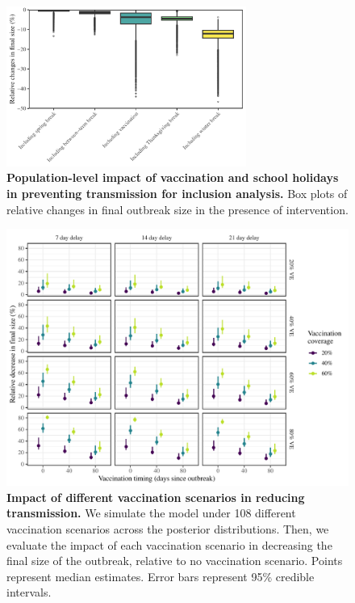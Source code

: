\documentclass[12pt]{article}
\begin{document}
\pagebreak

\begin{figure}[!th]
\begin{center}
\includegraphics[width=0.7\textwidth]{../figure_stanfit_seirv_final/figure_stanfit_effects_inclusion.pdf}
\caption{
\textbf{Population-level impact of vaccination and school holidays in preventing transmission for inclusion analysis.}
Box plots of relative changes in final outbreak size in the presence of intervention.
}
\end{center}
\end{figure}

\pagebreak

\begin{figure}[!h]
\includegraphics[width=\textwidth]{../figure_stanfit_seirv_final/figure_stanfit_strategy.pdf}
\caption{
\textbf{Impact of different vaccination scenarios in reducing transmission.}
We simulate the model under 108 different vaccination scenarios across the posterior distributions.
Then, we evaluate the impact of each vaccination scenario in decreasing the final size of the outbreak, relative to no vaccination scenario.
Points represent median estimates.
Error bars represent 95\% credible intervals.
}
\label{fig}
\end{figure}


\pagebreak


\end{document}

